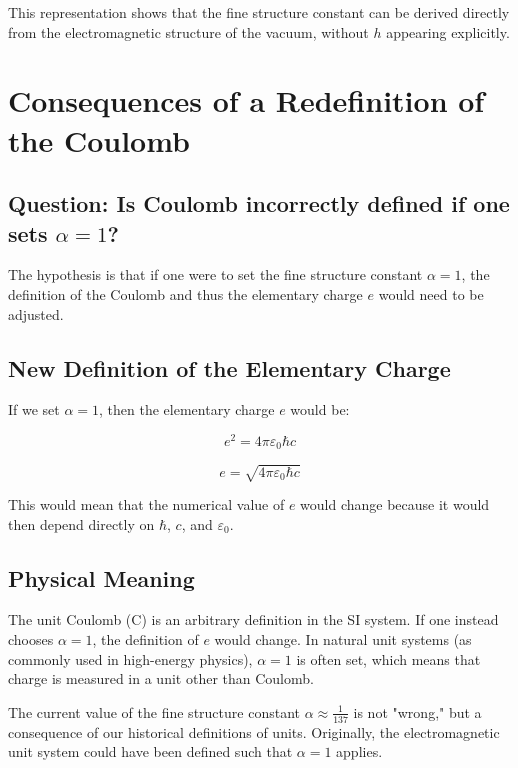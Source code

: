 \documentclass{article}
\begin{document}
This representation shows that the fine structure constant can be derived directly from the electromagnetic structure of the vacuum, without $h$ appearing explicitly.

\section{Consequences of a Redefinition of the Coulomb}

\subsection{Question: Is Coulomb incorrectly defined if one sets $\alpha = 1$?}

The hypothesis is that if one were to set the fine structure constant $\alpha = 1$, the definition of the Coulomb and thus the elementary charge $e$ would need to be adjusted.

\subsection{New Definition of the Elementary Charge}

If we set $\alpha = 1$, then the elementary charge $e$ would be:

\begin{equation}
	e^2 = 4\pi\varepsilon_0\hbar c
\end{equation}

\begin{equation}
	e = \sqrt{4\pi\varepsilon_0\hbar c}
\end{equation}

This would mean that the numerical value of $e$ would change because it would then depend directly on $\hbar$, $c$, and $\varepsilon_0$.

\subsection{Physical Meaning}

The unit Coulomb (C) is an arbitrary definition in the SI system. If one instead chooses $\alpha = 1$, the definition of $e$ would change. In natural unit systems (as commonly used in high-energy physics), $\alpha = 1$ is often set, which means that charge is measured in a unit other than Coulomb.

The current value of the fine structure constant $\alpha \approx \frac{1}{137}$ is not "wrong," but a consequence of our historical definitions of units. Originally, the electromagnetic unit system could have been defined such that $\alpha = 1$ applies.
\end{document}
